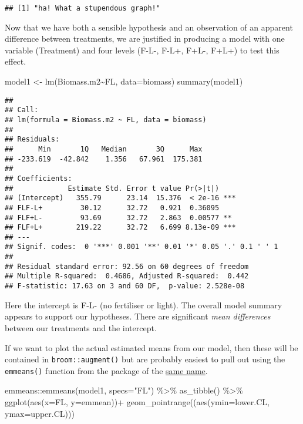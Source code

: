 \documentclass[
]{article}
\newenvironment{Shaded}{\begin{snugshade}}{\end{snugshade}}
\newcommand{\AttributeTok}[1]{\textcolor[rgb]{0.77,0.63,0.00}{#1}}
\newcommand{\FunctionTok}[1]{\textcolor[rgb]{0.00,0.00,0.00}{#1}}
\newcommand{\NormalTok}[1]{#1}
\newcommand{\OtherTok}[1]{\textcolor[rgb]{0.56,0.35,0.01}{#1}}
\newcommand{\SpecialCharTok}[1]{\textcolor[rgb]{0.00,0.00,0.00}{#1}}
\newcommand{\StringTok}[1]{\textcolor[rgb]{0.31,0.60,0.02}{#1}}
\begin{document}
\begin{verbatim}
## [1] "ha! What a stupendous graph!"
\end{verbatim}

Now that we have both a sensible hypothesis and an observation of an
apparent difference between treatments, we are justified in producing a
model with one variable (Treatment) and four levels (F-L-, F-L+, F+L-,
F+L+) to test this effect.

\begin{Shaded}
\begin{Highlighting}[]
\NormalTok{model1 }\OtherTok{\textless{}{-}} \FunctionTok{lm}\NormalTok{(Biomass.m2}\SpecialCharTok{\textasciitilde{}}\NormalTok{FL, }\AttributeTok{data=}\NormalTok{biomass)}
\FunctionTok{summary}\NormalTok{(model1)}
\end{Highlighting}
\end{Shaded}

\begin{verbatim}
## 
## Call:
## lm(formula = Biomass.m2 ~ FL, data = biomass)
## 
## Residuals:
##      Min       1Q   Median       3Q      Max 
## -233.619  -42.842    1.356   67.961  175.381 
## 
## Coefficients:
##             Estimate Std. Error t value Pr(>|t|)    
## (Intercept)   355.79      23.14  15.376  < 2e-16 ***
## FLF-L+         30.12      32.72   0.921  0.36095    
## FLF+L-         93.69      32.72   2.863  0.00577 ** 
## FLF+L+        219.22      32.72   6.699 8.13e-09 ***
## ---
## Signif. codes:  0 '***' 0.001 '**' 0.01 '*' 0.05 '.' 0.1 ' ' 1
## 
## Residual standard error: 92.56 on 60 degrees of freedom
## Multiple R-squared:  0.4686, Adjusted R-squared:  0.442 
## F-statistic: 17.63 on 3 and 60 DF,  p-value: 2.528e-08
\end{verbatim}

Here the intercept is F-L- (no fertiliser or light). The overall model
summary appears to support our hypotheses. There are significant
\emph{mean differences} between our treatments and the intercept.

If we want to plot the actual estimated means from our model, then these
will be contained in \texttt{broom::augment()} but are probably easiest
to pull out using the \texttt{emmeans()} function from the package of
the
\href{https://aosmith.rbind.io/2019/03/25/getting-started-with-emmeans/\#confidence-intervals-for-comparisons}{same
name}.

\begin{Shaded}
\begin{Highlighting}[]
\NormalTok{emmeans}\SpecialCharTok{::}\FunctionTok{emmeans}\NormalTok{(model1, }\AttributeTok{specs=}\StringTok{"FL"}\NormalTok{) }\SpecialCharTok{\%\textgreater{}\%} 
  \FunctionTok{as\_tibble}\NormalTok{() }\SpecialCharTok{\%\textgreater{}\%} 
  \FunctionTok{ggplot}\NormalTok{(}\FunctionTok{aes}\NormalTok{(}\AttributeTok{x=}\NormalTok{FL,}
             \AttributeTok{y=}\NormalTok{emmean))}\SpecialCharTok{+}
  \FunctionTok{geom\_pointrange}\NormalTok{((}\FunctionTok{aes}\NormalTok{(}\AttributeTok{ymin=}\NormalTok{lower.CL,}
                       \AttributeTok{ymax=}\NormalTok{upper.CL)))}
\end{Highlighting}
\end{Shaded}
\end{document}

